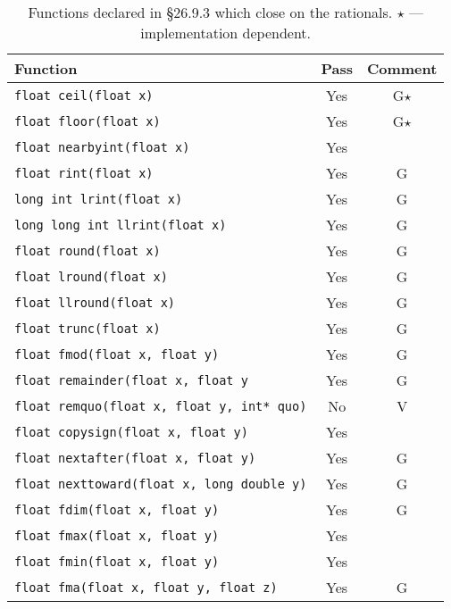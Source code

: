 \documentclass[prd,twocolumn,amsmath,amssymb,nofootinbib,eqsecnum]{revtex4-1}
\newcommand{\code}[1]{{\tt #1}}
\begin{document}
\begin{table}[h]
	\begin{tabular}{lcc}
		Function & Pass & Comment
	\\
	\hline \hline
		\code{float ceil(float x)} &  Yes & G$\star$
	\\
	\hline
		\code{float floor(float x)} & Yes & G$\star$
	\\
	\hline
		\code{float nearbyint(float x)} & Yes &
	\\
	\hline
		\code{float rint(float x)} & Yes & G
	\\
	\hline
		\code{long int lrint(float x)} &  Yes & G
	\\
	\hline
		\code{long long int llrint(float x)} & Yes & G
	\\
	\hline
		\code{float round(float x)} & Yes & G
	\\
	\hline
		\code{float lround(float x)} & Yes & G
	\\
	\hline
		\code{float llround(float x)} & Yes & G
	\\
	\hline
		\code{float trunc(float x)} &  Yes & G
	\\
	\hline
		\code{float fmod(float x, float y)} & Yes & G
	\\
	\hline
		\code{float remainder(float x, float y} & Yes & G
	\\
	\hline
		\code{float remquo(float x, float y, int* quo)} & No & V
	\\
	\hline
		\code{float copysign(float x, float y)} & Yes &
	\\
	\hline
		\code{float nextafter(float x, float y)} & Yes & G
	\\
	\hline
		\code{float nexttoward(float x, long double y)} & Yes & G
	\\
	\hline
		\code{float fdim(float x, float y)} & Yes & G
	\\
	\hline
		\code{float fmax(float x, float y)} & Yes &
	\\
	\hline
		\code{float fmin(float x, float y)} & Yes &
	\\
	\hline
		\code{float fma(float x, float y, float z)} & Yes & G
	\end{tabular}
\caption{Functions declared in \S 26.9.3 which close on the rationals. $\star$ --- implementation dependent.}
\label{tab:26.9.3}
\end{table}
\end{document}

